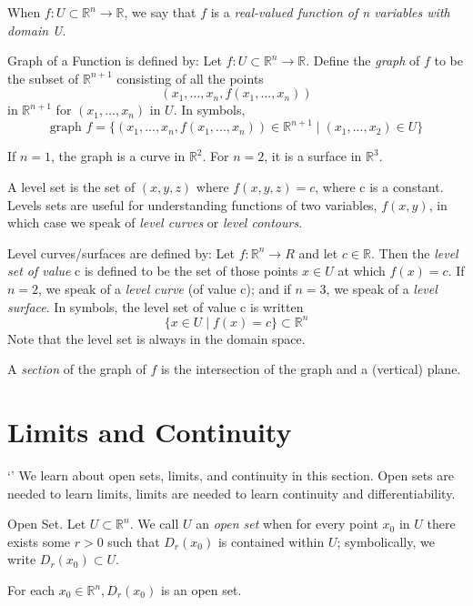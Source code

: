 \documentclass[12pt, letterpaper]{article}
\begin{document}
When \(f: U \subset \mathbb{R}^n \rightarrow \mathbb{R}\), we say that \(f\) is a \textit{real-valued function of n variables with domain U}.

Graph of a Function is defined by: Let \(f: U \subset \mathbb{R}^n \rightarrow \mathbb{R}\). Define the \textit{graph} of \(f\) to be the subset of \(\mathbb{R}^{n+1}\) consisting of all the points 
\[ 
(x_1,...,x_n,f(x_1,...,x_n))
\] 
in \(\mathbb{R}^{n+1}\) for \((x_1,...,x_n)\) in \(U\). In symbols,
\[ 
\text{graph }f = \{(x_1,...,x_n,f(x_1,...,x_n)) \in \mathbb{R}^{n+1} \mid (x_1,...,x_2) \in U\}
\] 

If \(n = 1\), the graph is a curve in \(\mathbb{R}^2\). For \(n = 2\), it is a surface in \(\mathbb{R}^3\).

A level set is the set of \((x,y,z)\) where \(f(x,y,z) = c\), where c is a constant. Levels sets are useful for understanding functions of two variables, \(f(x,y)\), in which case we speak of \textit{level curves} or \textit{level contours}.

Level curves/surfaces are defined by: Let \(f: \mathbb{R}^n \rightarrow R\) and let \(c \in \mathbb{R}\). Then the \textit{level set of value} c is defined to be the set of those points \(x \in U\) at which \(f(x) = c\). If \(n = 2\), we speak of a \textit{level curve} (of value c); and if \(n = 3\), we speak of a \textit{level surface}. In symbols, the level set of value c is written 
\[ 
\{x \in U \mid f(x) = c\} \subset \mathbb{R}^n
\] 
Note that the level set is always in the domain space.

A \textit{section} of the graph of \(f\) is the intersection of the graph and a (vertical) plane.

\section{Limits and Continuity}
`'
We learn about open sets, limits, and continuity in this section. Open sets are needed to learn limits, limits are needed to learn continuity and differentiability.

Open Set. Let \(U \subset \mathbb{R}^n\). We call \(U\) an \textit{open set} when for every point \(x_0\) in \(U\) there exists some \(r>0\) such that \(D_r(x_0)\) is contained within \(U\); symbolically, we write \(D_r(x_0) \subset U\).

For each \(x_0 \in \mathbb{R}^n, D_r(x_0)\) is an open set.
\end{document}
